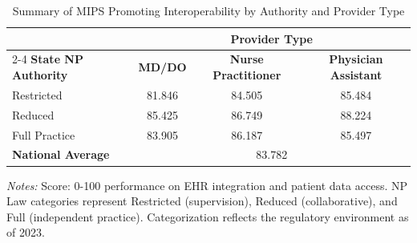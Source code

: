 \begin{table}[htbp]
    \centering
    \caption{Summary of MIPS Promoting Interoperability by Authority and Provider Type}
    \label{tab:mips_pi_score_provtype}
    \vspace{0.2cm}
    \begin{tabular}{lccc}
        \toprule
        & \multicolumn{3}{c}{\textbf{Provider Type}} \\
        \cmidrule(lr){2-4}
        \textbf{State NP Authority} & \textbf{MD/DO} & \textbf{Nurse Practitioner} & \textbf{Physician Assistant} \\
        \midrule
        Restricted & 81.846 & 84.505 & 85.484 \\
        Reduced & 85.425 & 86.749 & 88.224 \\
        Full Practice & 83.905 & 86.187 & 85.497 \\
        \midrule
        \textbf{National Average} & \multicolumn{3}{c}{83.782} \\
        \bottomrule
    \end{tabular}
    \vspace{0.1cm}
    \begin{minipage}{0.85\textwidth}
        \footnotesize \textit{Notes:} Score: 0-100 performance on EHR integration and patient data access. NP Law categories represent Restricted (supervision), Reduced (collaborative), and Full (independent practice). Categorization reflects the regulatory environment as of 2023.
    \end{minipage}
\end{table}